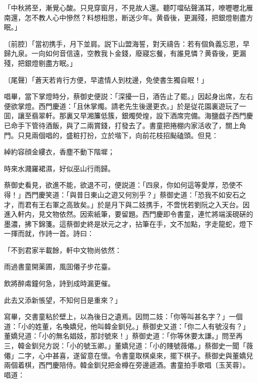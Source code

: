 \begin{myquote}
「中秋將至，漸覺心酸。只見穿窗月，不見故人還。聽叮噹砧聲滿耳，嘹嚦嚦北雁南還，怎不教人心中慘然？料想相思，断送少年。黄昏後，更漏殘，把銀燈剔盡方眠。」

{\markfont〔前腔〕}「當初携手，月下並肩。説下山盟海誓，對天禱告：若有個負義忘恩，早歸九泉。一向如何音信遠，空教我卜金錢，廢寢忘餐，有誰見憐？黄昏後，更漏殘，把銀燈剔盡方眠。」

{\markfont〔尾聲〕}「蒼天若肯行方便，早遣情人到枕邊，免使書生獨自眠！」
\end{myquote}

唱畢，當下掌燈時分，蔡御史便説：「深擾一日，酒告止了罷。」因起身出席，左右便欲掌燈。西門慶道：「且休掌燭。請老先生後邊更衣。」於是従花園裏遊玩了一囬，讓至翡翠軒。那裏又早湘簾低簇，銀燭熒煌，設下酒席完備。海鹽戯子西門慶已命手下管待酒飯，與了二兩賞錢，打發去了。書童把捲棚内家活收了，關上角門。只見兩個唱的，盛粧打扮，立於堦下，向前花枝招颭磕頭。但見：

\begin{myquote}
綽約容顔金縷衣，香塵不動下階墀；

時來水濺羅裙濕，好似巫山行雨歸。
\end{myquote}

蔡御史看見，欲進不能，欲退不可，便説道：「四泉，你如何這等愛厚，恐使不得！」西門慶笑道：「與昔日東山之遊又何別乎？」蔡御史道：「恐我不如安石之才，而君有王右軍之高致矣。」於是月下與二妓携手，不啻恍若劉阮之入天台。因進入軒内，見文物依然。因索紙筆，要留題。西門慶即令書童，連忙將端溪硯硏的墨濃，拂下錦箋。這蔡御史終是狀元之才，拈筆在手，文不加點，字走龍蛇，燈下一揮而就，作詩一首。詩曰：

\begin{myquote}
「不到君家半載餘，軒中文物尚依然：

雨過書童開薬圃，風囬僊子步花臺。

飲將醉䖏鐘何急，詩到成時漏更催。

此去又添新悵望，不知何日是重來？」
\end{myquote}

寫畢，交書童粘於壁上，以為後日之遺焉。因問二妓：「你等叫甚名字？」一個道：「小的姓董，名喚嬌兒，他叫韓金釧兒。」蔡御史又道：「你二人有號沒有？」董嬌兒道：「小的無名娼妓，那討號來！」蔡御史道：「你等休要太謙。」問至再三，韓金釧兒方説：「小的號玉卿。」董嬌兒道：「小的賤號薇僊。」蔡御史一聞「薇僊」二字，心中甚喜，遂留意在懷。令書童取棋桌來，擺下棋子。蔡御史與董嬌兒兩個着棋，西門慶陪侍。韓金釧兒把金樽在旁邊遞酒。書童拍手歌唱〔玉芙蓉〕。唱道：


